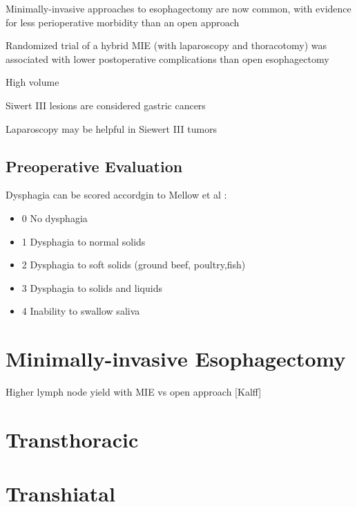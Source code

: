 \documentclass[
]{book}
\providecommand{\tightlist}{%
  \setlength{\itemsep}{0pt}\setlength{\parskip}{0pt}}
\begin{document}
Minimally-invasive approaches to esophagectomy are now common, with evidence for less perioperative morbidity than an open approach \citep{biere1887} \citep{zhoue0132889}

Randomized trial of a hybrid MIE (with laparoscopy and thoracotomy) was associated with lower postoperative complications than open esophagectomy \citep{mariette152}

High volume \citep{birkmeyer2117} \citep{wouters1789}

Siwert III lesions are considered gastric cancers \citep{rusch444} \citep{siewert260}

Laparoscopy may be helpful in Siewert III tumors \citep{degraaf988}

\hypertarget{preoperative-evaluation}{%
\subsection{Preoperative Evaluation}\label{preoperative-evaluation}}

Dysphagia can be scored accordgin to Mellow et al \citep{mellow1443}:

\begin{itemize}
\tightlist
\item
  0 No dysphagia
\item
  1 Dysphagia to normal solids
\item
  2 Dysphagia to soft solids (ground beef, poultry,fish)
\item
  3 Dysphagia to solids and liquids
\item
  4 Inability to swallow saliva
\end{itemize}

\hypertarget{minimally-invasive-esophagectomy}{%
\section{Minimally-invasive Esophagectomy}\label{minimally-invasive-esophagectomy}}

Higher lymph node yield with MIE vs open approach {[}Kalff{]}

\hypertarget{transthoracic}{%
\section{Transthoracic}\label{transthoracic}}

\hypertarget{transhiatal}{%
\section{Transhiatal}\label{transhiatal}}
\end{document}
